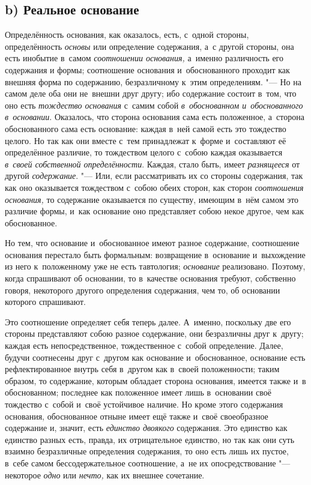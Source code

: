 \subsection[b) Реальное основание]{b) Реальное основание}

Определённость основания, как оказалось, есть, с~одной стороны, определённость
{\em основы} или определение содержания, а~с другой стороны, она есть инобытие
в~самом {\em соотношении основания,} а~именно различность его содержания и
формы; соотношение основания и~обоснованного проходит как внешняя форма по
содержанию, безразличному к~этим определениям. "--- Но на самом
деле оба они не~внешни друг другу; ибо содержание состоит
в~том, что оно есть {\em тождество основания} с~самим собой
{\em в~обоснованном и~обоснованного в~основании}. Оказалось, что сторона
основания сама есть положенное, а~сторона обоснованного сама есть основание:
каждая в~ней самой есть это тождество целого. Но так как они вместе с~тем
принадлежат к~форме и~составляют её определённое различие, то тождеством целого
с~собою каждая оказывается {\em в~своей собственной
определённости}. Каждая, стало быть,
имеет {\em разнящееся} от другой {\em содержание}. "--- Или, если рассматривать
их со стороны содержания, так как оно оказывается тождеством с~собою обеих
сторон, как сторон {\em соотношения основания,} то содержание оказывается по
существу, имеющим в~нём самом это различие формы, и~как основание оно
представляет собою некое другое, чем как обоснованное.

Но тем, что основание и~обоснованное имеют разное содержание, соотношение
основания перестало быть формальным: возвращение в~основание и~выхождение из
него к~положенному уже не есть тавтология; {\em основание} реализовано.
Поэтому, когда спрашивают об основании, то в~качестве основания требуют,
собственно говоря, некоторого другого определения содержания, чем то, об
основании которого спрашивают.

Это соотношение определяет себя теперь далее. А~именно, поскольку две его
стороны представляют собою разное содержание, они безразличны друг к~другу;
каждая есть непосредственное, тождественное с~собой определение. Далее, будучи
соотнесены друг с~другом как основание и~обоснованное, основание есть
рефлектированное внутрь себя в~другом как в~своей положенности; таким образом,
то содержание, которым обладает сторона основания, имеется также и~в
обоснованном; последнее как положенное имеет лишь в~основании своё тождество
с~собой и~своё устойчивое наличие. Но кроме этого содержания основания,
обоснованное отныне имеет ещё также и~своё своеобразное содержание и, значит,
есть {\em единство двоякого} содержания. Это единство как единство разных есть,
правда, их отрицательное единство, но так как они суть взаимно безразличные
определения содержания, то оно есть лишь их пустое, в~себе самом
бессодержательное соотношение, а~не их опосредствование "--- некоторое
{\em одно} или {\em нечто,} как их внешнее сочетание.

